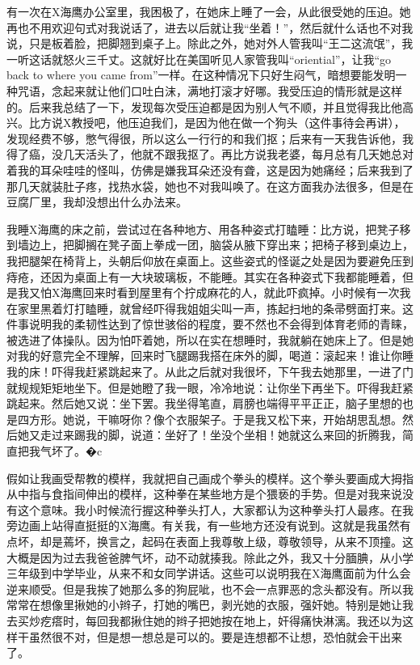 有一次在X海鹰办公室里，我困极了，在她床上睡了一会，从此很受她的压迫。她再也不用欢迎句式对我说话了，进去以后就让我“坐着！”，然后就什么话也不对我说，只是板着脸，把脚翘到桌子上。除此之外，她对外人管我叫“王二这流氓”，我一听这话就怒火三千丈。这就好比在美国听见人家管我叫“oriential”，让我“go back to where you came from”一样。在这种情况下只好生闷气，暗想要能发明一种咒语，念起来就让他们口吐白沫，满地打滚才好哪。我受压迫的情形就是这样的。后来我总结了一下，发现每次受压迫都是因为别人气不顺，并且觉得我比他高兴。比方说X教授吧，他压迫我们，是因为他在做一个狗头（这件事待会再讲），发现经费不够，憋气得很，所以这么一行行的和我们抠；后来有一天我告诉他，我得了癌，没几天活头了，他就不跟我抠了。再比方说我老婆，每月总有几天她总对着我的耳朵哇哇的怪叫，仿佛是嫌我耳朵还没有聋，这是因为她痛经；后来我到了那几天就装肚子疼，找热水袋，她也不对我叫唤了。在这方面我办法很多，但是在豆腐厂里，我却没想出什么办法来。 

我睡X海鹰的床之前，尝试过在各种地方、用各种姿式打瞌睡：比方说，把凳子移到墙边上，把脚搁在凳子面上拳成一团，脑袋从腋下穿出来；把椅子移到桌边上，我把腿架在椅背上，头朝后仰放在桌面上。这些姿式的怪诞之处是因为要避免压到痔疮，还因为桌面上有一大块玻璃板，不能睡。其实在各种姿式下我都能睡着，但是我又怕X海鹰回来时看到屋里有个拧成麻花的人，就此吓疯掉。小时候有一次我在家里黑着灯打瞌睡，就曾经吓得我姐姐尖叫一声，拣起扫地的条帚劈面打来。这件事说明我的柔韧性达到了惊世骇俗的程度，要不然也不会得到体育老师的青睐，被选进了体操队。因为怕吓着她，所以在实在想睡时，我就躺在她床上了。但是她对我的好意完全不理解，回来时飞腿踢我搭在床外的脚，喝道：滚起来！谁让你睡我的床！吓得我赶紧跳起来了。从此之后就对我很坏，下午我去她那里，一进了门就规规矩矩地坐下。但是她瞪了我一眼，冷冷地说：让你坐下再坐下。吓得我赶紧跳起来。然后她又说：坐下罢。我坐得笔直，肩膀也端得平平正正，脑子里想的也是四方形。她说，干嘛呀你？像个衣服架子。于是我又松下来，开始胡思乱想。然后她又走过来踢我的脚，说道：坐好了！坐没个坐相！她就这么来回的折腾我，简直把我气坏了。�c 

假如让我画受帮教的模样，我就把自己画成个拳头的模样。这个拳头要画成大拇指从中指与食指间伸出的模样，这种拳在某些地方是个猥亵的手势。但是对我来说没有这个意味。我小时候流行握这种拳头打人，大家都认为这种拳头打人最疼。在我旁边画上站得直挺挺的X海鹰。有关我，有一些地方还没有说到。这就是我虽然有点坏，却是蔫坏，换言之，起码在表面上我尊敬上级，尊敬领导，从来不顶撞。这大概是因为过去我爸爸脾气坏，动不动就揍我。除此之外，我又十分腼腆，从小学三年级到中学毕业，从来不和女同学讲话。这些可以说明我在X海鹰面前为什么会逆来顺受。但是我挨了她那么多的狗屁呲，也不会一点罪恶的念头都没有。所以我常常在想像里揪她的小辫子，打她的嘴巴，剥光她的衣服，强奸她。特别是她让我去买炒疙瘩时，每回我都揪住她的辫子把她按在地上，奸得痛快淋漓。我还以为这样干虽然很不对，但是想一想总是可以的。要是连想都不让想，恐怕就会干出来了。 


